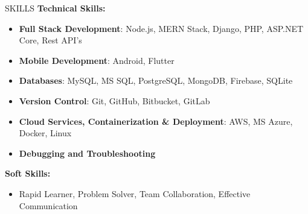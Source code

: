 \documentclass{resume} %
\begin{document}
\begin{rSection}{SKILLS}
\textbf{Technical Skills:}
\begin{itemize}
	\item \textbf{Full Stack Development}:  Node.js, MERN Stack, Django, PHP, ASP.NET Core, Rest API's
	\item \textbf{Mobile Development}: Android, Flutter
	\item \textbf{Databases}: MySQL, MS SQL, PostgreSQL, MongoDB, Firebase, SQLite
	\item \textbf{Version Control}: Git, GitHub, Bitbucket, GitLab
	\item \textbf{Cloud Services, Containerization \& Deployment}: AWS, MS Azure, Docker, Linux
	\item \textbf{Debugging and Troubleshooting}
	
\end{itemize}


\textbf{Soft Skills:} 
\begin{itemize}
\item Rapid Learner, Problem Solver, Team Collaboration, Effective Communication
\end{itemize}


\end{rSection}
  
\end{document}
